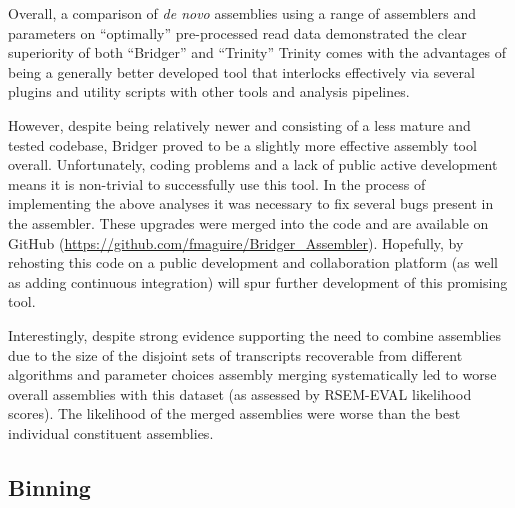 Overall, a comparison of \textit{de novo} assemblies
using a range of assemblers and parameters on ``optimally'' pre-processed
read data demonstrated the clear superiority of both ``Bridger'' and ``Trinity''
Trinity comes with the advantages of being a generally better developed tool that interlocks effectively via several plugins and utility
scripts with other tools and analysis pipelines.  

However, despite being relatively newer and consisting of
a less mature and tested codebase, Bridger proved to be
a slightly more effective assembly tool overall. Unfortunately,
coding problems and a lack of public active development means 
it is non-trivial to successfully use this tool.  In the process of 
implementing the above analyses it was necessary to fix several
bugs present in the assembler. These upgrades were merged into
the code and are available on GitHub (\url{https://github.com/fmaguire/Bridger_Assembler}).
Hopefully, by rehosting this code on a public development and collaboration
platform (as well as adding continuous integration) will 
spur further development of this promising tool.


Interestingly, despite strong evidence supporting the need to combine assemblies due to the 
size of the disjoint sets of transcripts recoverable from different algorithms and parameter
choices \citep{Lowe2014} assembly merging systematically led to worse overall assemblies
with this dataset (as assessed by RSEM-EVAL likelihood scores).  The likelihood of the merged
assemblies were worse than the best individual constituent assemblies.


\subsection{Binning}

